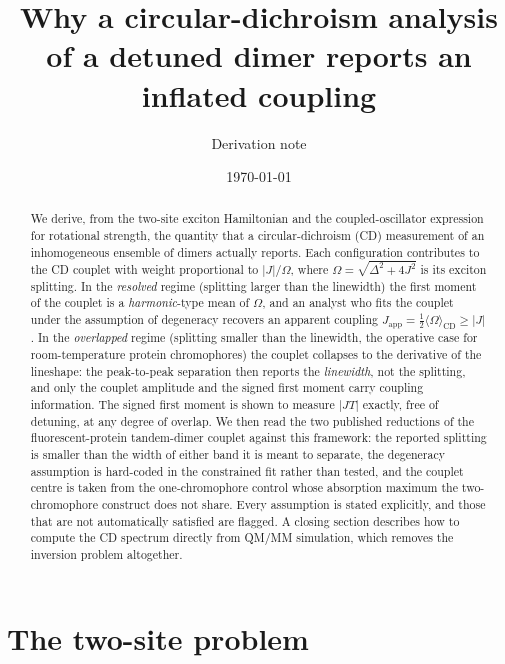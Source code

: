 \documentclass[11pt,a4paper]{article}
\title{Why a circular-dichroism analysis of a detuned dimer reports an
inflated coupling}
\author{Derivation note}
\date{\today}
\begin{document}
\maketitle

\begin{abstract}
We derive, from the two-site exciton Hamiltonian and the coupled-oscillator
expression for rotational strength, the quantity that a circular-dichroism (CD)
measurement of an inhomogeneous ensemble of dimers actually reports. Each
configuration contributes to the CD couplet with weight proportional to
$|J|/\Omega$, where $\Omega=\sqrt{\Delta^{2}+4J^{2}}$ is its exciton splitting.
In the \emph{resolved} regime (splitting larger than the linewidth) the first
moment of the couplet is a \emph{harmonic}-type mean of $\Omega$, and an
analyst who fits the couplet under the assumption of degeneracy recovers an
apparent coupling
$J_{\mathrm{app}}=\tfrac{1}{2}\langle\Omega\rangle_{\mathrm{CD}}\ge|J|$. In the
\emph{overlapped} regime (splitting smaller than the linewidth, the operative
case for room-temperature protein chromophores) the couplet collapses to the
derivative of the lineshape: the peak-to-peak separation then reports the
\emph{linewidth}, not the splitting, and only the couplet amplitude and the
signed first moment carry coupling information. The signed first moment is
shown to measure $|JT|$ exactly, free of detuning, at any degree of overlap.
We then read the two published reductions of the fluorescent-protein
tandem-dimer couplet against this framework: the reported splitting is smaller
than the width of either band it is meant to separate, the degeneracy
assumption is hard-coded in the constrained fit rather than tested, and the
couplet centre is taken from the one-chromophore control whose absorption
maximum the two-chromophore construct does not share.
Every assumption is stated explicitly, and those that are not automatically
satisfied are flagged. A closing section describes how to compute the CD
spectrum directly from QM/MM simulation, which removes the inversion problem
altogether.
\end{abstract}

\section{The two-site problem}
\end{document}
